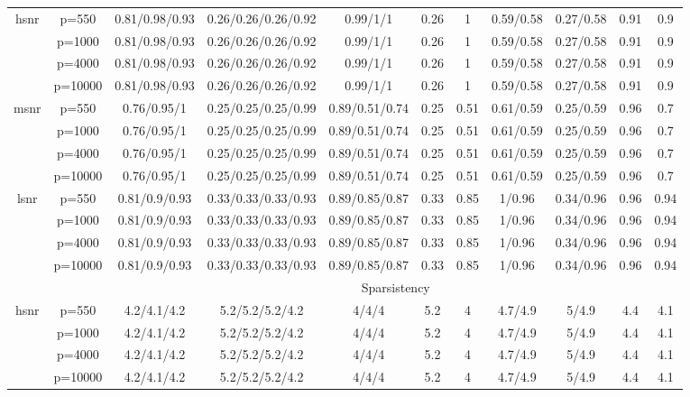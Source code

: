 \begin{table}[ht]
{\begin{tabular}{|c|c|ccccccccc|}
\midrule\multirow{4}[2]{*}{hsnr} & p=550 & 0.81/0.98/0.93 & 0.26/0.26/0.26/0.92 & 0.99/1/1 & 0.26 & 1 & 0.59/0.58 & 0.27/0.58 & 0.91 & 0.9 \\ 
   & p=1000 & 0.81/0.98/0.93 & 0.26/0.26/0.26/0.92 & 0.99/1/1 & 0.26 & 1 & 0.59/0.58 & 0.27/0.58 & 0.91 & 0.9 \\ 
   & p=4000 & 0.81/0.98/0.93 & 0.26/0.26/0.26/0.92 & 0.99/1/1 & 0.26 & 1 & 0.59/0.58 & 0.27/0.58 & 0.91 & 0.9 \\ 
   & p=10000 & 0.81/0.98/0.93 & 0.26/0.26/0.26/0.92 & 0.99/1/1 & 0.26 & 1 & 0.59/0.58 & 0.27/0.58 & 0.91 & 0.9 \\ 
  \midrule\multirow{4}[2]{*}{msnr} & p=550 & 0.76/0.95/1 & 0.25/0.25/0.25/0.99 & 0.89/0.51/0.74 & 0.25 & 0.51 & 0.61/0.59 & 0.25/0.59 & 0.96 & 0.7 \\ 
   & p=1000 & 0.76/0.95/1 & 0.25/0.25/0.25/0.99 & 0.89/0.51/0.74 & 0.25 & 0.51 & 0.61/0.59 & 0.25/0.59 & 0.96 & 0.7 \\ 
   & p=4000 & 0.76/0.95/1 & 0.25/0.25/0.25/0.99 & 0.89/0.51/0.74 & 0.25 & 0.51 & 0.61/0.59 & 0.25/0.59 & 0.96 & 0.7 \\ 
   & p=10000 & 0.76/0.95/1 & 0.25/0.25/0.25/0.99 & 0.89/0.51/0.74 & 0.25 & 0.51 & 0.61/0.59 & 0.25/0.59 & 0.96 & 0.7 \\ 
  \midrule\multirow{4}[2]{*}{lsnr} & p=550 & 0.81/0.9/0.93 & 0.33/0.33/0.33/0.93 & 0.89/0.85/0.87 & 0.33 & 0.85 & 1/0.96 & 0.34/0.96 & 0.96 & 0.94 \\ 
   & p=1000 & 0.81/0.9/0.93 & 0.33/0.33/0.33/0.93 & 0.89/0.85/0.87 & 0.33 & 0.85 & 1/0.96 & 0.34/0.96 & 0.96 & 0.94 \\ 
   & p=4000 & 0.81/0.9/0.93 & 0.33/0.33/0.33/0.93 & 0.89/0.85/0.87 & 0.33 & 0.85 & 1/0.96 & 0.34/0.96 & 0.96 & 0.94 \\ 
   & p=10000 & 0.81/0.9/0.93 & 0.33/0.33/0.33/0.93 & 0.89/0.85/0.87 & 0.33 & 0.85 & 1/0.96 & 0.34/0.96 & 0.96 & 0.94 \\ 
   \midrule 
 \multicolumn{1}{|c}{} &       & \multicolumn{9}{c|}{Sparsistency} \\
\midrule\multirow{4}[2]{*}{hsnr} & p=550 & 4.2/4.1/4.2 & 5.2/5.2/5.2/4.2 & 4/4/4 & 5.2 & 4 & 4.7/4.9 & 5/4.9 & 4.4 & 4.1 \\ 
   & p=1000 & 4.2/4.1/4.2 & 5.2/5.2/5.2/4.2 & 4/4/4 & 5.2 & 4 & 4.7/4.9 & 5/4.9 & 4.4 & 4.1 \\ 
   & p=4000 & 4.2/4.1/4.2 & 5.2/5.2/5.2/4.2 & 4/4/4 & 5.2 & 4 & 4.7/4.9 & 5/4.9 & 4.4 & 4.1 \\ 
   & p=10000 & 4.2/4.1/4.2 & 5.2/5.2/5.2/4.2 & 4/4/4 & 5.2 & 4 & 4.7/4.9 & 5/4.9 & 4.4 & 4.1 \\ 

\end{tabular}}
\end{table}
